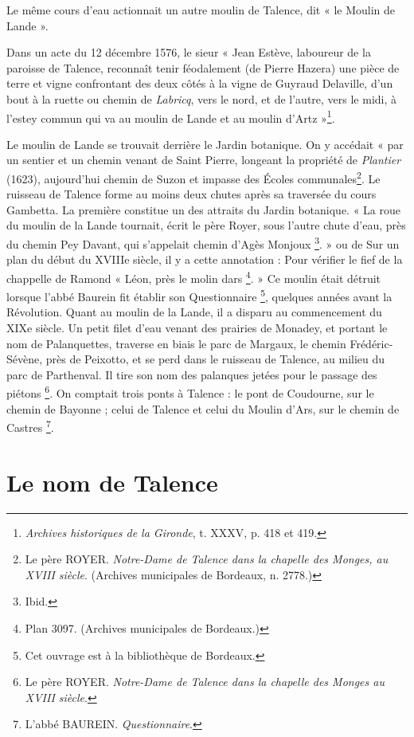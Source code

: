 Le même cours d'eau actionnait un autre moulin de Talence, dit « le Moulin de Lande ».

Dans un acte du 12 décembre 1576, le sieur « Jean Estève, laboureur de la paroisse de Talence, reconnaît tenir féodalement (de Pierre Hazera) une pièce de terre et vigne confrontant des deux côtés à la vigne de Guyraud Delaville, d'un bout à la ruette ou chemin de \textit{Labricq}, vers le nord, et de l'autre, vers le midi, à l'estey commun qui va au moulin de Lande et au moulin d'Artz »\footnote{\textit{Archives historiques de la Gironde}, t. XXXV, p. 418 et 419.}.

Le moulin de Lande se trouvait derrière le Jardin botanique. On y accédait « par un sentier et un chemin venant de Saint Pierre, longeant la propriété de \textit{Plantier} (1623), aujourd'hui chemin de Suzon et impasse des Écoles communales\footnote{Le père ROYER. \textit{Notre-Dame de Talence dans la chapelle des Monges, au XVIII\ieme{} siècle}. (Archives municipales de Bordeaux, n. 2778.)}. Le ruisseau de Talence forme au moins deux chutes après sa traversée du cours Gambetta. La première constitue un des attraits du Jardin botanique. « La roue du moulin de la Lande tournait, écrit le père Royer, sous l'autre chute d'eau, près du chemin Pey Davant, qui s'appelait chemin d'Agès Monjoux \footnote{Ibid.}. » ou de Sur un plan du début du XVIIIe siècle, il y a cette annotation : Pour vérifier le fief de la chappelle de Ramond « Léon, près le molin dars \footnote{Plan 3097. (Archives municipales de Bordeaux.)}. » Ce moulin était détruit lorsque l'abbé Baurein fit établir son Questionnaire \footnote{Cet ouvrage est à la bibliothèque de Bordeaux.}, quelques années avant la Révolution. Quant au moulin de la Lande, il a disparu au commencement du XIXe siècle. Un petit filet d'eau venant des prairies de Monadey, et portant le nom de Palanquettes, traverse en biais le parc de Margaux, le chemin Frédéric-Sévène, près de Peixotto, et se perd dans le ruisseau de Talence, au milieu du parc de Parthenval. Il tire son nom des palanques jetées pour le passage des piétons \footnote{Le père ROYER. \textit{Notre-Dame de Talence dans la chapelle des Monges au XVIII\ieme{} siècle}.}. On comptait trois ponts à Talence : le pont de Coudourne, sur le chemin de Bayonne ; celui de Talence et celui du Moulin d'Ars, sur le chemin de Castres \footnote{L'abbé BAUREIN. \textit{Questionnaire}.}. 

\section{Le nom de Talence}

